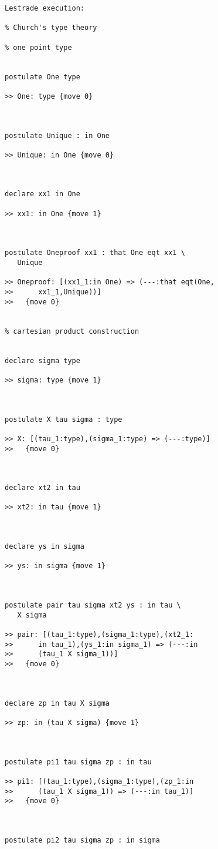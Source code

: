 \documentclass[12pt]{article}
\begin{document}
\begin{verbatim}Lestrade execution:

% Church's type theory

% one point type


postulate One type

>> One: type {move 0}



postulate Unique : in One

>> Unique: in One {move 0}



declare xx1 in One

>> xx1: in One {move 1}



postulate Oneproof xx1 : that One eqt xx1 \
   Unique

>> Oneproof: [(xx1_1:in One) => (---:that eqt(One,
>>      xx1_1,Unique))]
>>   {move 0}


% cartesian product construction


declare sigma type

>> sigma: type {move 1}



postulate X tau sigma : type

>> X: [(tau_1:type),(sigma_1:type) => (---:type)]
>>   {move 0}



declare xt2 in tau

>> xt2: in tau {move 1}



declare ys in sigma

>> ys: in sigma {move 1}



postulate pair tau sigma xt2 ys : in tau \
   X sigma

>> pair: [(tau_1:type),(sigma_1:type),(xt2_1:
>>      in tau_1),(ys_1:in sigma_1) => (---:in
>>      (tau_1 X sigma_1))]
>>   {move 0}



declare zp in tau X sigma

>> zp: in (tau X sigma) {move 1}



postulate pi1 tau sigma zp : in tau

>> pi1: [(tau_1:type),(sigma_1:type),(zp_1:in
>>      (tau_1 X sigma_1)) => (---:in tau_1)]
>>   {move 0}



postulate pi2 tau sigma zp : in sigma


\end{verbatim}
\end{document}

